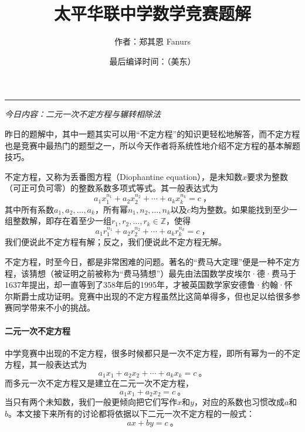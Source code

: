 \documentclass[a4,12pt]{article}
\begin{document}
	\title{
		\vspace*{-50pt}
		\Large{\textbf{太平华联中学数学竞赛题解}\vspace*{-10pt}}\\
	}
	\author{作者：郑其恩 Fanurs\vspace*{-30pt}}
	\date{最后编译时间：\DTMnow （美东）}
	\maketitle
	\vspace*{-25pt}

\vspace*{10pt}\hrule\vspace*{10pt}
\begin{center}\Large{\emph{今日内容：二元一次不定方程与辗转相除法}}\end{center}

昨日的题解中，其中一题其实可以用“不定方程”的知识更轻松地解答，而不定方程也是竞赛中最热门的题型之一，所以今天作者将系统性地介绍不定方程的基本解题技巧。

不定方程，又称为丢番图方程（Diophantine equation），是未知数$x$要求为整数（可正可负可零）的整数系数多项式等式。其一般表达式为
\[ a_1x_1^{n_1} + a_2x_2^{n_2} + \cdots + a_kx_k^{n_k} = c \ \mbox{，} \]
其中所有系数$a_1, a_2, \ldots, a_k$，所有幂$n_1, n_2, \ldots, n_k$以及$c$均为整数。如果能找到至少一组整数解，即存在着至少一组$r_1, r_2, \ldots, r_k\in\mathbb{Z}$，使得
\[ a_1r_1^{n_1} + a_2r_2^{n_2} + \cdots + a_kr_k^{n_k} = c \ \mbox{，} \]
我们便说此不定方程有解；反之，我们便说此不定方程无解。

不定方程，时至今日，都是非常困难的问题。著名的“费马大定理”便是一种不定方程，该猜想（被证明之前被称为“费马猜想”）最先由法国数学皮埃尔·德·费马于1637年提出，却一直等到了358年后的1995年，才被英国数学家安德鲁·约翰·怀尔斯爵士成功证明。竞赛中出现的不定方程虽然比这简单得多，但也足以给很多参赛同学带来不小的挑战。

\paragraph{二元一次不定方程}
	中学竞赛中出现的不定方程，很多时候都只是一次不定方程，即所有幂为一的不定方程，其一般表达式为
	\[ a_1x_1 + a_2x_2 + \cdots + a_kx_k = c \ \mbox{。} \]
	而多元一次不定方程又是建立在二元一次不定方程，
	\[ a_1x_1 + a_2x_2 = c \ \mbox{。} \]
	当只有两个未知数，我们一般更倾向把它们写作$x$和$y$，对应的系数也习惯改成$a$和$b$。本文接下来所有的讨论都将依据以下二元一次不定方程的一般式：
	\[ ax + by = c \ \mbox{。} \]
\end{document}
